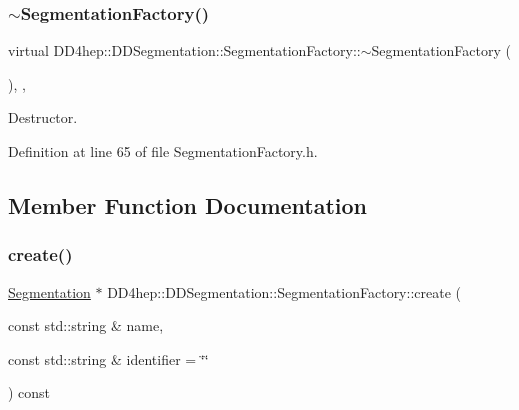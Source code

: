 \hypertarget{class_d_d4hep_1_1_d_d_segmentation_1_1_segmentation_factory_ad6a96f6c5e29ff089d4c0d4196133d07}{}\label{class_d_d4hep_1_1_d_d_segmentation_1_1_segmentation_factory_ad6a96f6c5e29ff089d4c0d4196133d07} 
\subsubsection{\texorpdfstring{$\sim$\+Segmentation\+Factory()}{~SegmentationFactory()}}
{\footnotesize\ttfamily virtual D\+D4hep\+::\+D\+D\+Segmentation\+::\+Segmentation\+Factory\+::$\sim$\+Segmentation\+Factory (\begin{DoxyParamCaption}{ }\end{DoxyParamCaption})\hspace{0.3cm}{\ttfamily [inline]}, {\ttfamily [protected]}, {\ttfamily [virtual]}}



Destructor. 



Definition at line 65 of file Segmentation\+Factory.\+h.



\subsection{Member Function Documentation}
\hypertarget{class_d_d4hep_1_1_d_d_segmentation_1_1_segmentation_factory_ac0bc19db7946436c3be4a33fa70de8a0}{}\label{class_d_d4hep_1_1_d_d_segmentation_1_1_segmentation_factory_ac0bc19db7946436c3be4a33fa70de8a0} 
\subsubsection{\texorpdfstring{create()}{create()}}
{\footnotesize\ttfamily \hyperlink{class_d_d4hep_1_1_d_d_segmentation_1_1_segmentation}{Segmentation} $\ast$ D\+D4hep\+::\+D\+D\+Segmentation\+::\+Segmentation\+Factory\+::create (\begin{DoxyParamCaption}\item[{const std\+::string \&}]{name,  }\item[{const std\+::string \&}]{identifier = {\ttfamily \char`\"{}\char`\"{}} }\end{DoxyParamCaption}) const}



